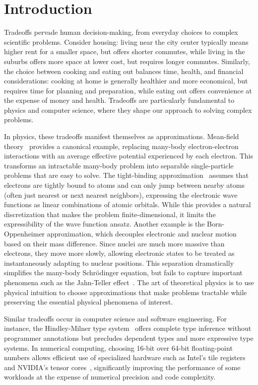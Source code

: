 \chapter{Introduction}\label{ch:intro}

Tradeoffs pervade human decision-making, from everyday choices to complex scientific problems. Consider housing: living near the city center typically means higher rent for a smaller space, but offers shorter commutes, while living in the suburbs offers more space at lower cost, but requires longer commutes. Similarly, the choice between cooking and eating out balances time, health, and financial considerations: cooking at home is generally healthier and more economical, but requires time for planning and preparation, while eating out offers convenience at the expense of money and health. Tradeoffs are particularly fundamental to physics and computer science, where they shape our approach to solving complex problems.

In physics, these tradeoffs manifest themselves as approximations. Mean-field theory~\cite{Bruus2004ManyBody} provides a canonical example, replacing many-body electron-electron interactions with an average effective potential experienced by each electron. This transforms an intractable many-body problem into separable single-particle problems that are easy to solve. The tight-binding approximation~\cite{Kittel2005IntroductionTo,Vonsov2012QuantumSolidS} assumes that electrons are tightly bound to atoms and can only jump between nearby atoms (often just nearest or next nearest neighbors), expressing the electronic wave functions as linear combinations of atomic orbitals. While this provides a natural discretization that makes the problem finite-dimensional, it limits the expressibility of the wave function ansatz. Another example is the Born-Oppenheimer approximation, which decouples electronic and nuclear motion based on their mass difference. Since nuclei are much more massive than electrons, they move more slowly, allowing electronic states to be treated as instantaneously adapting to nuclear positions. This separation dramatically simplifies the many-body Schrödinger equation, but fails to capture important phenomena such as the Jahn-Teller effect~\cite{Vonsov2012QuantumSolidS}. The art of theoretical physics is to use physical intuition to choose approximations that make problems tractable while preserving the essential physical phenomena of interest.

Similar tradeoffs occur in computer science and software engineering. For instance, the Hindley-Milner type system~\cite{Hindle_1969_The_Principal_T,Milner_1978_A_theory_of_typ} offers complete type inference without programmer annotations but precludes dependent types and more expressive type systems. In numerical computing, choosing 16-bit over 64-bit floating-point numbers allows efficient use of specialized hardware such as Intel's tile registers~\cite{Intel_AMX} and NVIDIA's tensor cores~\cite{NvidiaTensorCores}, significantly improving the performance of some workloads at the expense of numerical precision and code complexity.

